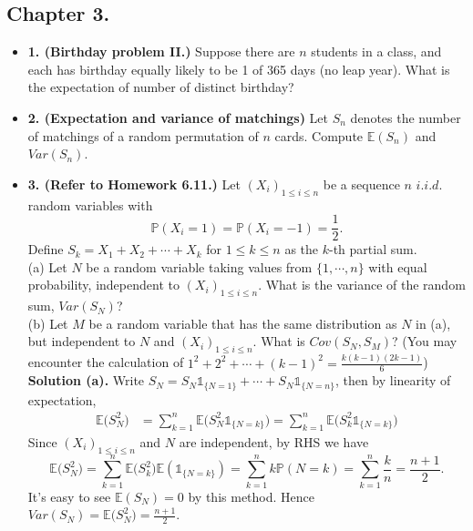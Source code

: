 \documentclass[12pt]{article}
\begin{document}
\subsection*{Chapter 3.}
\begin{itemize}
    \item \textbf{1. (Birthday problem II.)}
    Suppose there are \(n\) students in a class, and each has birthday equally likely to be 1 of 365 days (no leap year). 
    What is the expectation of number of distinct birthday?
    \item \textbf{2. (Expectation and variance of matchings)} Let $S_n$ denotes the number of matchings of a random permutation of $n$ cards. Compute $\mathbb{E}(S_n)$ and $Var(S_n)$.
    \item \textbf{3. (Refer to Homework 6.11.)} Let $(X_i)_{1\leq i\leq n}$ be a sequence $n$ $i.i.d.$ random variables with
\begin{equation*}
\mathbb{P}(X_i=1)=\mathbb{P}(X_i=-1)=\frac{1}{2}.
\end{equation*}
Define $S_k=X_1+X_2+\cdots+X_k$ for $1\leq k\leq n$ as the $k$-th partial sum.\\
(a) Let $N$ be a random variable taking values from $\{1,\cdots,n\}$ with equal probability, independent to $(X_i)_{1\leq i\leq n}$. What is the variance of the random sum, $Var(S_N)$? \\
(b) Let $M$ be a random variable that has the same distribution as $N$ in (a), but independent to $N$ and $(X_i)_{1\leq i\leq n}$. What is $Cov(S_N,S_M)$? (You may encounter the calculation of $1^2+2^2+\cdots+(k-1)^2=\frac{k(k-1)(2k-1)}{6}$)\\
\textbf{Solution (a).} Write $S_N=S_N\mathds{1}_{\{N=1\}}+\cdots+S_N\mathds{1}_{\{N=n\}}$, then by linearity of expectation,
\begin{equation*}
\begin{aligned}
\mathbb{E}\big(S_N^2\big) &= \sum_{k=1}^n\mathbb{E}\big(S_N^2\mathds{1}_{\{N=k\}}\big)=\sum_{k=1}^n\mathbb{E}\big(S_k^2\mathds{1}_{\{N=k\}}\big)
\end{aligned}
\end{equation*}
Since $(X_i)_{1\leq i\leq n}$ and $N$ are independent, by RHS we have
\begin{equation*}
\mathbb{E}\big(S_N^2\big)=\sum_{k=1}^n\mathbb{E}\big(S_k^2\big)\mathbb{E}(\mathds{1}_{\{N=k\}})=\sum_{k=1}^nk\mathbb{P}(N=k)=\sum_{k=1}^n\frac{k}{n}=\frac{n+1}{2}.
\end{equation*}
It's easy to see $\mathbb{E}(S_N)=0$ by  this method. Hence $Var(S_N)=\mathbb{E}\big(S_N^2\big)=\frac{n+1}{2}$.

\end{itemize}
\end{document}
